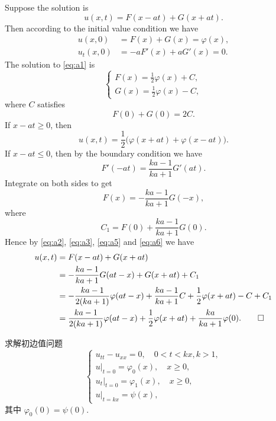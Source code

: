 \begin{solution}
  Suppose the solution is
  \[ u(x,t) = F(x-at) + G(x+at). \]
  Then according to the initial value condition we have
  \begin{equation}\label{eq:a1}
    \begin{aligned}
      u(x,0) & = F(x) + G(x) = \varphi(x), \\
      u_t(x,0) & = -a F'(x) + a G'(x) = 0.
    \end{aligned}
  \end{equation}
  The solution to \eqref{eq:a1} is
  \begin{equation}\label{eq:a2}
    \begin{cases}
      F(x) = \frac12 \varphi(x) + C, \\
      G(x) = \frac12 \varphi(x) - C,
    \end{cases}
  \end{equation}
  where $C$ satisfies
  \begin{equation}\label{eq:a3}
    F(0) + G(0) = 2C.
  \end{equation}
  If $x-at\geq 0$, then
  \[ u(x,t) = \frac12 \bigl(\varphi(x+at) + \varphi(x-at)\bigr). \]
  If $x-at\leq 0$, then by the boundary condition we have
  \begin{equation}\label{eq:a4}
    F'(-at) = \frac{ka-1}{ka+1} G'(at).
  \end{equation}
  Integrate on both sides to get
  \begin{equation}\label{eq:a5}
    F(x) = - \frac{ka-1}{ka+1} G(-x),
  \end{equation}
  where
  \begin{equation}\label{eq:a6}
    C_1 = F(0) + \frac{ka-1}{ka+1} G(0).
  \end{equation}
  Hence by \eqref{eq:a2}, \eqref{eq:a3}, \eqref{eq:a5} and \eqref{eq:a6} we have
  \begin{align*}
    u(x,t)
    & = F(x-at) + G(x+at) \\
    & = - \frac{ka-1}{ka+1} G(at-x) + G(x+at) + C_1 \\
    & = - \frac{ka-1}{2(ka+1)} \varphi(at-x) + \frac{ka-1}{ka+1} C
        + \frac12\varphi(x+at) - C + C_1 \\
    & = \frac{ka-1}{2(ka+1)} \varphi(at-x) + \frac12 \varphi(x+at)
        + \frac{ka}{ka+1} \varphi(0). \qedhere
  \end{align*}
\end{solution}

\begin{exercise}[6]
  求解初边值问题
  \[\begin{cases}
    u_{tt} - u_{xx} = 0,\quad 0<t<kx, k>1, \\
    u|_{t=0} = \varphi_0(x),\quad x\geq 0, \\
    u_t|_{t=0} = \varphi_1(x),\quad x\geq 0, \\
    u|_{t=kx} = \psi(x),
  \end{cases}\]
  其中 $\varphi_0(0) = \psi(0)$.
\end{exercise}

